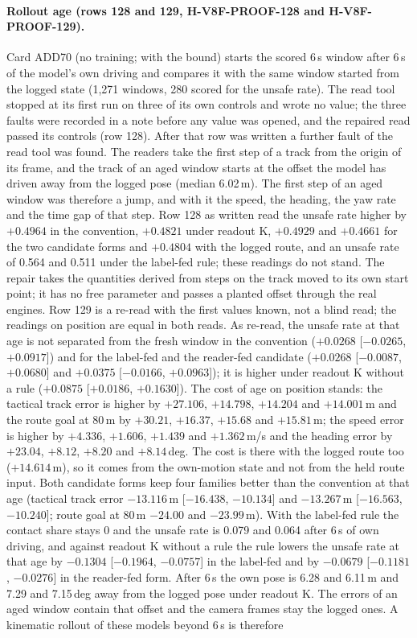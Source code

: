 \paragraph{Rollout age (rows 128 and 129, H-V8F-PROOF-128 and H-V8F-PROOF-129).} Card ADD70 (no training;  with the bound) starts the scored 6\,s window after 6\,s of the model's own driving and compares it with the same window started from the logged state (1,271 windows, 280 scored for the unsafe rate). The read tool stopped at its first run on three of its own controls and wrote no value; the three faults were recorded in a note before any value was opened, and the repaired read passed its controls (row 128). After that row was written a further fault of the read tool was found. The readers take the first step of a track from the origin of its frame, and the track of an aged window starts at the offset the model has driven away from the logged pose (median 6.02\,m). The first step of an aged window was therefore a jump, and with it the speed, the heading, the yaw rate and the time gap of that step. Row 128 as written read the unsafe rate higher by $+0.4964$ in the convention, $+0.4821$ under readout K, $+0.4929$ and $+0.4661$ for the two candidate forms and $+0.4804$ with the logged route, and an unsafe rate of 0.564 and 0.511 under the label-fed rule; these readings do not stand. The repair takes the quantities derived from steps on the track moved to its own start point; it has no free parameter and passes a planted offset through the real engines. Row 129 is a re-read with the first values known, not a blind read; the readings on position are equal in both reads. As re-read, the unsafe rate at that age is not separated from the fresh window in the convention ($+0.0268$ [$-0.0265$, $+0.0917$]) and for the label-fed and the reader-fed candidate ($+0.0268$ [$-0.0087$, $+0.0680$] and $+0.0375$ [$-0.0166$, $+0.0963$]); it is higher under readout K without a rule ($+0.0875$ [$+0.0186$, $+0.1630$]). The cost of age on position stands: the tactical track error is higher by $+27.106$, $+14.798$, $+14.204$ and $+14.001$\,m and the route goal at 80\,m by $+30.21$, $+16.37$, $+15.68$ and $+15.81$\,m; the speed error is higher by $+4.336$, $+1.606$, $+1.439$ and $+1.362$\,m/s and the heading error by $+23.04$, $+8.12$, $+8.20$ and $+8.14$\,deg. The cost is there with the logged route too ($+14.614$\,m), so it comes from the own-motion state and not from the held route input. Both candidate forms keep four families better than the convention at that age (tactical track error $-13.116$\,m [$-16.438$, $-10.134$] and $-13.267$\,m [$-16.563$, $-10.240$]; route goal at 80\,m $-24.00$ and $-23.99$\,m). With the label-fed rule the contact share stays 0 and the unsafe rate is 0.079 and 0.064 after 6\,s of own driving, and against readout K without a rule the rule lowers the unsafe rate at that age by $-0.1304$ [$-0.1964$, $-0.0757$] in the label-fed and by $-0.0679$ [$-0.1181$, $-0.0276$] in the reader-fed form. After 6\,s the own pose is 6.28 and 6.11\,m and 7.29 and 7.15\,deg away from the logged pose under readout K. The errors of an aged window contain that offset and the camera frames stay the logged ones. A kinematic rollout of these models beyond 6\,s is therefore 